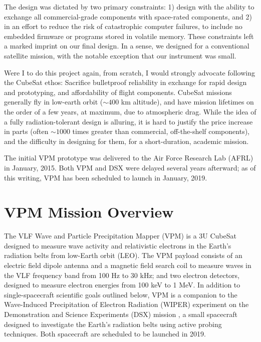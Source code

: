 The design was dictated by two primary constraints: 1) design with the ability to exchange all commercial-grade components with space-rated components, and 2) in an effort to reduce the risk of catastrophic computer failures, to include no embedded firmware or programs stored in volatile memory. These constraints left a marked imprint on our final design. In a sense, we designed for a conventional satellite mission, with the notable exception that our instrument was small.

Were I to do this project again, from scratch, I would strongly advocate following the CubeSat ethos: Sacrifice bulletproof reliability in exchange for rapid design and prototyping, and affordability of flight components. CubeSat missions generally fly in low-earth orbit ($\sim 400$ km altitude), and have mission lifetimes on the order of a few years, at maximum, due to atmospheric drag. While the idea of a fully radiation-tolerant design is alluring, it is hard to justify the price increase in parts (often $\sim 1000$ times greater than commercial, off-the-shelf components), and the difficulty in designing for them, for a short-duration, academic mission.

The initial VPM prototype was delivered to the Air Force Research Lab (AFRL) in January, 2015. Both VPM and DSX were delayed several years afterward; as of this writing, VPM has been scheduled to launch in January, 2019.

\section{VPM Mission Overview}
The VLF Wave and Particle Precipitation Mapper (VPM) is a 3U CubeSat designed to measure wave activity and relativistic electrons in the Earth's radiation belts from low-Earth orbit (LEO). The VPM payload consists of an electric field dipole antenna and a magnetic field search coil to measure waves in the VLF frequency band from 100 Hz to 30 kHz; and two electron detectors, designed to measure electron energies from 100 keV to 1 MeV. In addition to single-spacecraft scientific goals outlined below, VPM is a companion to the Wave-Induced Precipitation of Electron Radiation (WIPER) experiment on the Demonstration and Science Experiments (DSX) mission \citep{Schoenberg2006, Spanjers2006}, a small spacecraft designed to investigate the Earth's radiation belts using active probing techniques. Both spacecraft are scheduled to be launched in 2019.

